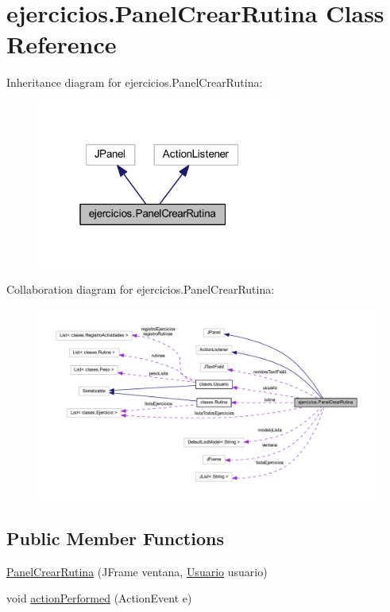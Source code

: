 \hypertarget{classejercicios_1_1_panel_crear_rutina}{}\section{ejercicios.\+Panel\+Crear\+Rutina Class Reference}
\label{classejercicios_1_1_panel_crear_rutina}


Inheritance diagram for ejercicios.\+Panel\+Crear\+Rutina\+:
\nopagebreak
\begin{figure}[H]
\begin{center}
\leavevmode
\includegraphics[width=229pt]{classejercicios_1_1_panel_crear_rutina__inherit__graph}
\end{center}
\end{figure}


Collaboration diagram for ejercicios.\+Panel\+Crear\+Rutina\+:
\nopagebreak
\begin{figure}[H]
\begin{center}
\leavevmode
\includegraphics[width=350pt]{classejercicios_1_1_panel_crear_rutina__coll__graph}
\end{center}
\end{figure}
\subsection*{Public Member Functions}
\begin{DoxyCompactItemize}
\item 
\mbox{\hyperlink{classejercicios_1_1_panel_crear_rutina_a1bca1f4a1eb62c2e8b879bb00df884a3}{Panel\+Crear\+Rutina}} (J\+Frame ventana, \mbox{\hyperlink{classclases_1_1_usuario}{Usuario}} usuario)
\item 
void \mbox{\hyperlink{classejercicios_1_1_panel_crear_rutina_a4e2ad610b1b2be17aafd6fb490aac55f}{action\+Performed}} (Action\+Event e)
\end{DoxyCompactItemize}



